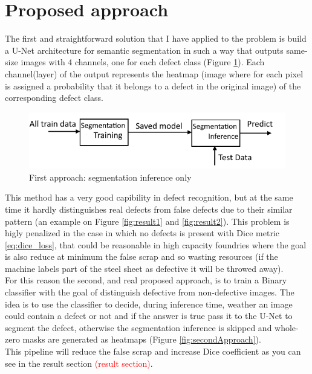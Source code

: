 \documentclass[10pt,twocolumn,letterpaper]{article}
\begin{document}
\section{Proposed approach}
   The first and straightforward solution that I have applied to the problem is build a U-Net architecture for semantic segmentation in such a way that outputs same-size images with 4 channels, one for each defect class (Figure \ref{fig:firstApproach}). 
   Each channel(layer) of the output represents the heatmap (image where for each pixel is assigned a probability that it belongs to a defect in the original image) of the corresponding defect class. 

   \begin{figure}[h]
      \centering
      \caption{First approach: segmentation inference only} \label{fig:firstApproach}
      \includegraphics[scale=0.55]{Img_FirstApproach}
   \end{figure}

   This method has a very good capibility in defect recognition, but at the same time it hardly distinguishes real defects from false defects due to their similar pattern (an example on Figure \ref{fig:result1} and \ref{fig:result2}). This problem is higly penalized in the case in which no defects is present with Dice metric \eqref{eq:dice_loss}, that could be reasonable in high capacity foundries where the goal is also reduce at minimum the false scrap and so wasting resources (if the machine labels part of the steel sheet as defective it will be throwed away).\\
   For this reason the second, and real proposed approach, is to train a Binary classifier with the goal of distinguish defective from non-defective images. The idea is to use the classifier to decide, during inference time, weather an image could contain a defect or not and if the answer is true pass it to the U-Net to segment the defect, otherwise the segmentation inference  is skipped and whole-zero masks are generated as heatmaps (Figure \ref{fig:secondApproach}).\\
   This pipeline will reduce the false scrap and increase Dice coefficient as you can see in the result section \textcolor{red}{(result section)}.
    
\end{document}
